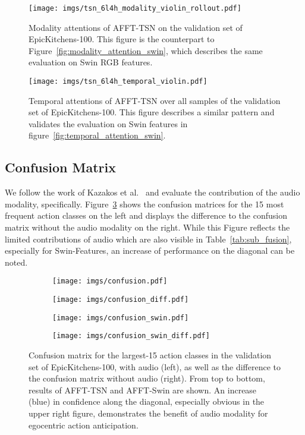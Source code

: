\documentclass[10pt,twocolumn,letterpaper,dvipsnames]{article}
\newcommand{\sname}{AFFT}
\begin{document}
\begin{figure}[b]
    \centering
    \texttt{[image: imgs/tsn\_6l4h\_modality\_violin\_rollout.pdf]}
    \caption{Modality attentions of AFFT-TSN on the validation set of EpicKitchens-100. This figure is the counterpart to Figure~\ref{fig:modality_attention_swin}, which describes the same evaluation on Swin RGB features.}
    \label{fig:modality_attention_tsn}
\end{figure}

\begin{figure}[b]
    \centering
        \texttt{[image: imgs/tsn\_6l4h\_temporal\_violin.pdf]}
        \caption{Temporal attentions of AFFT-TSN over all samples of the validation set of EpicKitchens-100. This figure describes a similar pattern and validates the evaluation on Swin features in figure~\ref{fig:temporal_attention_swin}.}
        \label{fig:temporal_attention_tsn}
\end{figure}

\subsection{Confusion Matrix}
\label{suppsec:confusion}
We follow the work of Kazakos et al.~\cite{kazakosEPICFusionAudioVisualTemporal2019} and evaluate the contribution of the audio modality, specifically. Figure~\ref{fig:confusion} shows the confusion matrices for the 15 most frequent action classes on the left and displays the difference to the confusion matrix without the audio modality on the right. While this Figure reflects the limited contributions of audio which are also visible in Table~\ref{tab:sub_fusion}, especially for Swin-Features, an increase of performance on the diagonal can be noted.

\begin{figure}[t]
    \centering
    \begin{subfigure}{0.49\linewidth}
        \texttt{[image: imgs/confusion.pdf]}
    \end{subfigure}
    \begin{subfigure}{0.49\linewidth}
        \texttt{[image: imgs/confusion\_diff.pdf]}
    \end{subfigure}
    \begin{subfigure}{0.49\linewidth}
        \texttt{[image: imgs/confusion\_swin.pdf]}
    \end{subfigure}
    \begin{subfigure}{0.49\linewidth}
        \texttt{[image: imgs/confusion\_swin\_diff.pdf]}
    \end{subfigure}
    \caption{Confusion matrix for the largest-15 action classes in the validation set of EpicKitchens-100, with audio (left), as well as the difference to the confusion matrix without audio (right). From top to bottom, results of \sname-TSN and \sname-Swin are shown. An increase (blue) in confidence along the diagonal, especially obvious in the upper right figure, demonstrates the benefit of audio modality for egocentric action anticipation.}
    \label{fig:confusion}
\end{figure}
\end{document}

